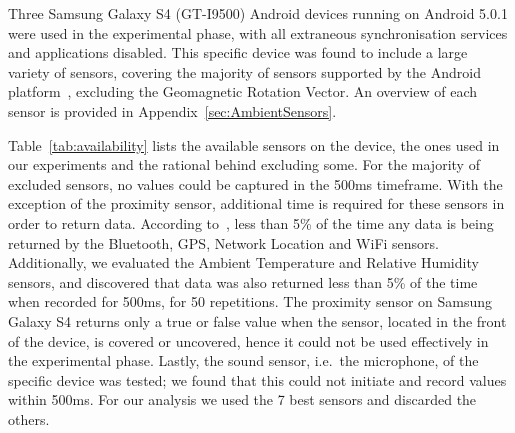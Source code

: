 \documentclass[runningheads,a4paper]{llncs}
\begin{document}
Three Samsung Galaxy S4 (GT-I9500) Android devices running on Android 5.0.1 were used in the experimental phase, with all extraneous synchronisation services and applications disabled. This specific device was found to include a large variety of sensors, covering the majority of sensors supported by the Android platform~\cite{androidsensors}, excluding the Geomagnetic Rotation Vector.
An overview of each sensor is provided in Appendix~\ref{sec:AmbientSensors}.

Table~\ref{tab:availability} lists the available sensors on the device, the ones used in our experiments and the rational behind excluding some.
For the majority of excluded sensors, no values could be captured in the 500ms timeframe.
With the exception of the proximity sensor, additional time is required for these sensors in order to return data.
According to~\cite{Anonymous}, less than 5\% of the time any data is being returned by the Bluetooth, GPS, Network Location and WiFi sensors.
Additionally, we evaluated the Ambient Temperature and Relative Humidity sensors, and discovered that data was also returned less than 5\% of the time when recorded for 500ms, for 50 repetitions.
The proximity sensor on Samsung Galaxy S4 returns only a true or false value when the sensor, located in the front of the device, is covered or uncovered, hence it could not be used effectively in the experimental phase.
Lastly, the sound sensor, i.e.\ the microphone, of the specific device was tested; we found that this could not initiate and record values within 500ms. For our analysis we used the 7 best sensors and discarded the others. 
\end{document}
